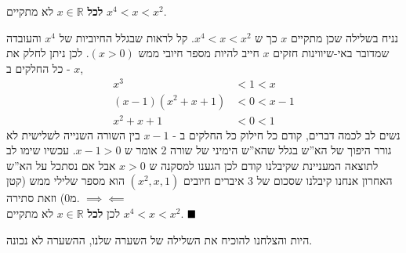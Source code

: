 \documentclass[a4paper,12pt]{article}
\renewcommand{\qed}{\hfill\blacksquare}
\newcommand{\te}[1]{\textenglish{#1}}
\begin{document}
\begin{RTL}
\begin{theorem*}
  \textbf{לכל} $x \in \mathbb{R}$ לא מתקיים $x^4 < x < x^2$.
\end{theorem*}
\begin{Proof}
  נניח בשלילה שכן מתקיים $x$ כך ש $x^4 < x < x^2$.  קל לראות שבגלל החיוביות של $x^4$ והעובדה שמדובר באי-שיווינות חזקים $x$ חייב להיות מספר חיובי ממש $(x > 0)$. לכן ניתן לחלק את כל החלקים ב - $x$, 
  \begin{align*}
    x^3 &< 1 < x \\
    \left(x-1\right)\left(x^2 + x + 1\right) &< 0 < x - 1 \\
    x^2 + x + 1 & < 0 < 1
  \end{align*}
  נשים לב לכמה דברים, קודם כל חילוק כל החלקים ב - $x-1$ בין השורה השנייה לשלישית לא גורר היפוך של הא''ש בגלל שהא''ש הימיני של שורה 2 אומר ש $x - 1 > 0$. עכשיו שימו לב לתוצאה המעניינת שקיבלנו קודם לכן הגענו למסקנה ש $x > 0$ אבל אם נסתכל על הא''ש האחרון אנחנו קיבלנו שסכום של 3 איברים חיובים $(x^2, x, 1)$ הוא מספר שלילי ממש (קטן מ0) וזאת סתירה. $\implies \impliedby$ \\
  לכן  \textbf{לכל} $x \in \mathbb{R}$ לא מתקיים $x^4 < x < x^2$. $\qed$

\end{Proof}
היות והצלחנו להוכיח את השלילה של השערה שלנו, ההשערה לא נכונה.



\end{RTL}
\end{document}
